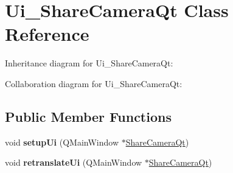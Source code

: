\hypertarget{class_ui___share_camera_qt}{\section{Ui\-\_\-\-Share\-Camera\-Qt Class Reference}
\label{class_ui___share_camera_qt}
}


Inheritance diagram for Ui\-\_\-\-Share\-Camera\-Qt\-:


Collaboration diagram for Ui\-\_\-\-Share\-Camera\-Qt\-:
\subsection*{Public Member Functions}
\begin{DoxyCompactItemize}
\item 
\hypertarget{class_ui___share_camera_qt_a5585c8038006744f631c1238fcd271b4}{void {\bfseries setup\-Ui} (Q\-Main\-Window $\ast$\hyperlink{class_share_camera_qt}{Share\-Camera\-Qt})}\label{class_ui___share_camera_qt_a5585c8038006744f631c1238fcd271b4}

\item 
\hypertarget{class_ui___share_camera_qt_abf9cc93e137372d939f7c6b93e72e072}{void {\bfseries retranslate\-Ui} (Q\-Main\-Window $\ast$\hyperlink{class_share_camera_qt}{Share\-Camera\-Qt})}\label{class_ui___share_camera_qt_abf9cc93e137372d939f7c6b93e72e072}

\end{DoxyCompactItemize}
